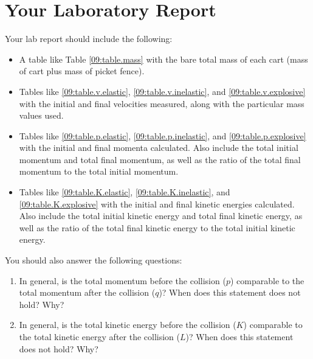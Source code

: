 \section{Your Laboratory Report}
Your lab report should include the following:
\begin{itemize}
    \item A table like Table \ref{09:table.mass} with the bare total mass of each cart (mass of cart plus mass of picket fence).
    \item Tables like \ref{09:table.v.elastic}, \ref{09:table.v.inelastic}, and \ref{09:table.v.explosive} with the initial and final velocities measured, along with the particular mass values used.
    \item Tables like \ref{09:table.p.elastic}, \ref{09:table.p.inelastic}, and \ref{09:table.p.explosive} with the initial and final momenta calculated. Also include the total initial momentum and total final momentum, as well as the ratio of the total final momentum to the total initial momentum.
    \item Tables like \ref{09:table.K.elastic}, \ref{09:table.K.inelastic}, and \ref{09:table.K.explosive} with the initial and final kinetic energies calculated. Also include the total initial kinetic energy and total final kinetic energy, as well as the ratio of the total final kinetic energy to the total initial kinetic energy.
\end{itemize}
You should also answer the following questions:
\begin{enumerate}
    \item In general, is the total momentum before the collision ($p$) comparable to the total momentum after the collision ($q$)? When does this statement does not hold? Why?
    \item In general, is the total kinetic energy before the collision ($K$) comparable to the total kinetic energy after the collision ($L$)? When does this statement does not hold? Why?
\end{enumerate}
\newpage
